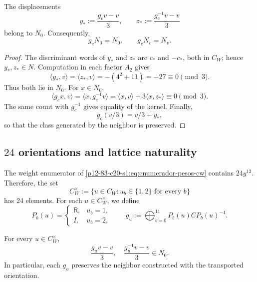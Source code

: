 \begin{theorem}
\label{p12-83-c20-s8:thm:preservacion-vecino-orden-tres-u031}
The displacements
\begin{equation}
 y_*:=\frac{g_cv-v}{3},
 \qquad
 z_*:=\frac{g_c^{-1}v-v}{3}
 \label{p12-83-c20-s8:eq:desplazamientos-vecino-u031}
\end{equation}
belong to \(N_0\). Consequently,
\[
 g_cN_0=N_0,
 \qquad
 g_cN_v=N_v.
\]
\end{theorem}

\begin{proof}
The discriminant words of \(y_*\) and \(z_*\) are
\(c_*\) and \(-c_*\), both in \(C_W\); hence
\(y_*,z_*\in N\). Computation in each factor \(A_2\) gives
\begin{equation}
 \langle y_*,v\rangle
 =\langle z_*,v\rangle
 =-(4^2+11)=-27\equiv0\pmod3.
 \label{p12-83-c20-s8:eq:emparejamientos-desplazamientos-u031}
\end{equation}
Thus both lie in \(N_0\). For \(x\in N_0\),
\[
 \langle g_cx,v\rangle
 =\langle x,g_c^{-1}v\rangle
 =\langle x,v\rangle+3\langle x,z_*\rangle
 \equiv0\pmod3.
\]
The same count with \(g_c^{-1}\) gives equality of the kernel. Finally,
\[
 g_c(v/3)=v/3+y_*,
\]
so that the class generated by the neighbor is preserved.
\end{proof}

\subsection{\(24\) orientations and lattice naturality}

The weight enumerator of \eqref{p12-83-c20-s1:eq:enumerador-pesos-cw} contains
\(24y^{12}\). Therefore, the set
\[
 C_W^\times:=
 \{u\in C_W:u_b\in\{1,2\}\text{ for every }b\}
\]
has 24 elements. For each \(u\in C_W^\times\), we define
\[
 P_b(u)=
 \begin{cases}
  \mathsf R,&u_b=1,\\
  I,&u_b=2,
 \end{cases}
 \qquad
 g_u:=\bigoplus_{b=0}^{11}P_b(u)CP_b(u)^{-1}.
\]

\begin{proposition}
\label{p12-83-c20-s8:prop:robustez-orientaciones-u031}
For every \(u\in C_W^\times\),
\[
 \frac{g_uv-v}{3},
 \quad
 \frac{g_u^{-1}v-v}{3}
 \in N_0.
\]
In particular, each \(g_u\) preserves the neighbor constructed with the
transported orientation.
\end{proposition}

